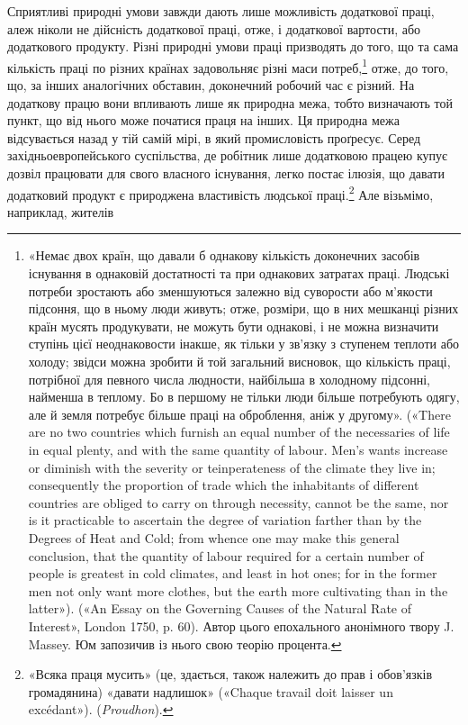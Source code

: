 Сприятливі природні умови завжди дають лише можливість
додаткової праці, алеж ніколи не дійсність додаткової праці,
отже, і додаткової вартости, або додаткового продукту. Різні
природні умови праці призводять до того, що та сама кількість
праці по різних країнах задовольняє різні маси потреб,\footnote{
«Немає двох країн, що давали б однакову кількість доконечних
засобів існування в однаковій достатності та при однакових затратах
праці. Людські потреби зростають або зменшуються залежно від суворости
або м’якости підсоння, що в ньому люди живуть; отже, розміри, що в
них мешканці різних країн мусять продукувати, не можуть бути однакові,
і не можна визначити ступінь цієї неоднаковости інакше, як тільки у
зв’язку з ступенем теплоти або холоду; звідси можна зробити й той загальний
висновок, що кількість праці, потрібної для певного числа людности,
найбільша в холодному підсонні, найменша в теплому. Бо в першому
не тільки люди більше потребують одягу, але й земля потребує
більше праці на оброблення, аніж у другому». («There are no two countries
which furnish an equal number of the necessaries of life in equal plenty,
and with the same quantity of labour. Men’s wants increase or diminish
with the severity or teinperateness of the climate they live in; consequently
the proportion of trade which the inhabitants of different countries are
obliged to carry on through necessity, cannot be the same, nor is it practicable
to ascertain the degree of variation farther than by the Degrees of
Heat and Cold; from whence one may make this general conclusion, that
the quantity of labour required for a certain number of people is greatest
in cold climates, and least in hot ones; for in the former men not only want
more clothes, but the earth more cultivating than in the latter»). («An
Essay on the Governing Causes of the Natural Rate of Interest», London
1750, p. 60). Автор цього епохального анонімного твору J. Massey.
Юм запозичив із нього свою теорію процента.
} отже,
до того, що, за інших аналогічних обставин, доконечний робочий
час є різний. На додаткову працю вони впливають лише як
природна межа, тобто визначають той пункт, що від нього може
початися праця на інших. Ця природна межа відсувається назад
у тій самій мірі, в який промисловість проґресує. Серед західньоевропейського
суспільства, де робітник лише додатковою працею
купує дозвіл працювати для свого власного існування, легко
постає ілюзія, що давати додатковий продукт є природжена властивість
людської праці.\footnote{
«Всяка праця мусить» (це, здається, також належить до прав і
обов’язків громадянина) «давати надлишок» («Chaque travail doit
laisser un excédant»). (\emph{Proudhon}).
} Але візьмімо, наприклад, жителів
